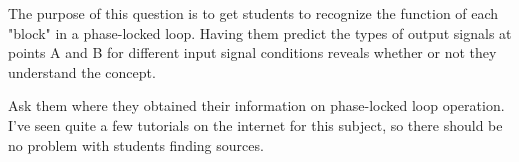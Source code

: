 \medskip







The purpose of this question is to get students to recognize the function of each "block" in a phase-locked loop.  Having them predict the types of output signals at points A and B for different input signal conditions reveals whether or not they understand the concept.

Ask them where they obtained their information on phase-locked loop operation.  I've seen quite a few tutorials on the internet for this subject, so there should be no problem with students finding sources.



